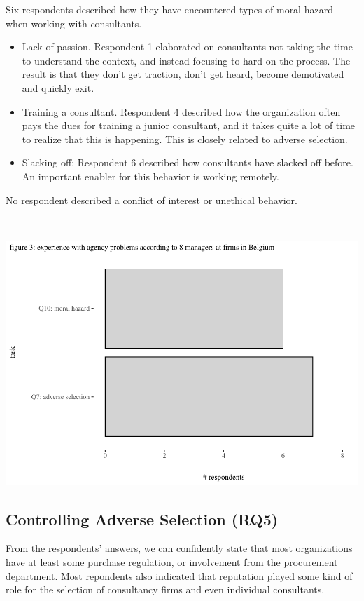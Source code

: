 \documentclass[12pt]{article}
\providecommand{\tightlist}{%
  \setlength{\itemsep}{0pt}\setlength{\parskip}{0pt}}
\begin{document}
Six respondents described how they have encountered types of moral
hazard when working with consultants.

\begin{itemize}
\tightlist
\item
  Lack of passion. Respondent 1 elaborated on consultants not taking the
  time to understand the context, and instead focusing to hard on the
  process. The result is that they don't get traction, don't get heard,
  become demotivated and quickly exit.
\item
  Training a consultant. Respondent 4 described how the organization
  often pays the dues for training a junior consultant, and it takes
  quite a lot of time to realize that this is happening. This is closely
  related to adverse selection.
\item
  Slacking off: Respondent 6 described how consultants have slacked off
  before. An important enabler for this behavior is working remotely.
\end{itemize}

No respondent described a conflict of interest or unethical behavior.

\(~\)

\begin{center}\includegraphics[width=0.75\linewidth]{2_ams_five_pager_files/figure-latex/unnamed-chunk-5-1} \end{center}

\subsection{Controlling Adverse Selection
(RQ5)}\label{controlling-adverse-selection-rq5}

From the respondents' answers, we can confidently state that most
organizations have at least some purchase regulation, or involvement
from the procurement department. Most repondents also indicated that
reputation played some kind of role for the selection of consultancy
firms and even individual consultants.
\end{document}

